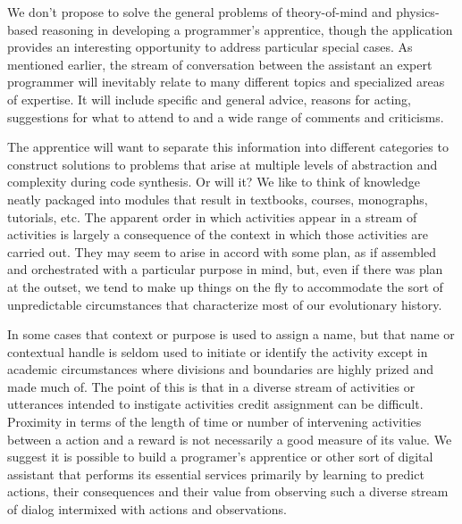 
We don't propose to solve the general problems of theory-of-mind and physics-based reasoning in developing a programmer's apprentice, though the application provides an interesting opportunity to address particular special cases. As mentioned earlier, the stream of conversation between the assistant an expert programmer will inevitably relate to many different topics and specialized areas of expertise. It will include specific and general advice, reasons for acting, suggestions for what to attend to and a wide range of comments and criticisms. 

The apprentice will want to separate this information into different categories to construct solutions to problems that arise at multiple levels of abstraction and complexity during code synthesis. Or will it? We like to think of knowledge neatly packaged into modules that result in textbooks, courses, monographs, tutorials, etc. The apparent order in which activities appear in a stream of activities is largely a consequence of the context in which those activities are carried out. They may seem to arise in accord with some plan, as if assembled and orchestrated with a particular purpose in mind, but, even if there was plan at the outset, we tend to make up things on the fly to accommodate the sort of unpredictable circumstances that characterize most of our evolutionary history. 

In some cases that context or purpose is used to assign a name, but that name or contextual handle is seldom used to initiate or identify the activity except in academic circumstances where divisions and boundaries are highly prized and made much of. The point of this is that in a diverse stream of activities \emdash{} or utterances intended to instigate activities \emdash{} credit assignment can be difficult. Proximity in terms of the length of time or number of intervening activities between a action and a reward is not necessarily a good measure of its value. We suggest it is possible to build a programer's apprentice or other sort of digital assistant that performs its essential services primarily by learning to predict actions, their consequences and their value from observing such a diverse stream of dialog intermixed with actions and observations. 



